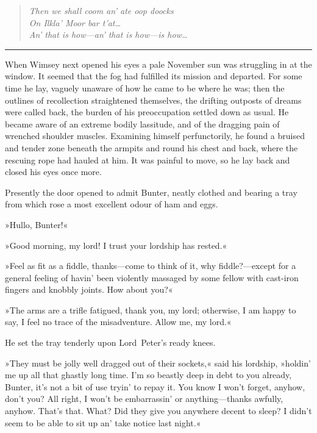 \begin{quote}\itshape
Then we shall coom an' ate oop doocks\\
On Ilkla' Moor bar t'at\dots\\
An' that is how—{\small an' that is how—}{\footnotesize is how\dots}\\
\end{quote}

\noindent\hfil\rule{0.5\textwidth}{.4pt}\hfil 

When Wimsey next opened his eyes a pale November sun was struggling in at the window. It seemed that the fog had fulfilled its mission and departed. For some time he lay, vaguely unaware of how he came to be where he was; then the outlines of recollection straightened themselves, the drifting outposts of dreams were called back, the burden of his preoccupation settled down as usual. He became aware of an extreme bodily lassitude, and of the dragging pain of wrenched shoulder muscles. Examining himself perfunctorily, he found a bruised and tender zone beneath the armpits and round his chest and back, where the rescuing rope had hauled at him. It was painful to move, so he lay back and closed his eyes once more.

Presently the door opened to admit Bunter, neatly clothed and bearing a tray from which rose a most excellent odour of ham and eggs.

»Hullo, Bunter!«

»Good morning, my lord! I trust your lordship has rested.«

»Feel as fit as a fiddle, thanks—come to think of it, why fiddle?—except for a general feeling of havin' been violently massaged by some fellow with cast-iron fingers and knobbly joints. How about you?«

»The arms are a trifle fatigued, thank you, my lord; otherwise, I am happy to say, I feel no trace of the misadventure. Allow me, my lord.«

He set the tray tenderly upon Lord~Peter's ready knees.

»They must be jolly well dragged out of their sockets,« said his lordship, »holdin' me up all that ghastly long time. I'm so beastly deep in debt to you already, Bunter, it's not a bit of use tryin' to repay it. You know I won't forget, anyhow, don't you? All right, I won't be embarrassin' or anything—thanks awfully, anyhow. That's that.  What? Did they give you anywhere decent to sleep? I didn't seem to be able to sit up an' take notice last night.«

